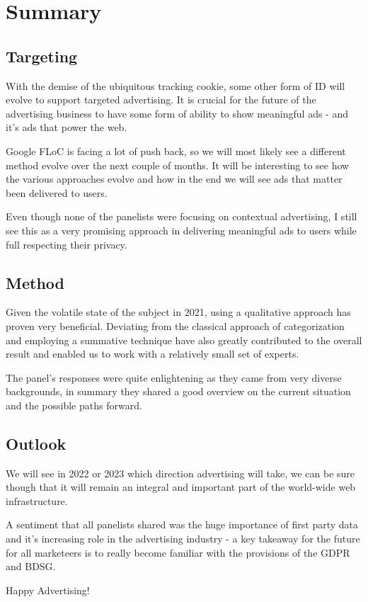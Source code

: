 %
%

\pagebreak
\section{Summary}

\onehalfspacing

\subsection{Targeting}

With the demise of the ubiquitous tracking cookie, some other form of ID will evolve to support targeted advertising. It is crucial for the future of the advertising business to have some form of ability to show meaningful ads - and it's ads that power the web.

Google FLoC is facing a lot of push back, so we will most likely see a different method evolve over the next couple of months. It will be interesting to see how the various approaches evolve and how in the end we will see ads that matter been delivered to users.

Even though none of the panelists were focusing on contextual advertising, I still see this as a very promising approach in delivering meaningful ads to users while full respecting their privacy.

\subsection{Method}

Given the volatile state of the subject in 2021, using a qualitative approach has proven very beneficial. Deviating from the classical approach of categorization and employing a summative technique have also greatly contributed to the overall result and enabled us to work with a relatively small set of experts.

The panel's responses were quite enlightening as they came from very diverse backgrounds, in summary they shared a good overview on the current situation and the possible paths forward. 

\subsection{Outlook}

We will see in 2022 or 2023 which direction advertising will take, we can be sure though that it will remain an integral and important part of the world-wide web infrastructure.

A sentiment that all panelists shared was the huge importance of first party data and it's increasing role in the advertising industry - a key takeaway for the future for all marketeers is to really become familiar with the provisions of the GDPR and BDSG.

Happy Advertising!
